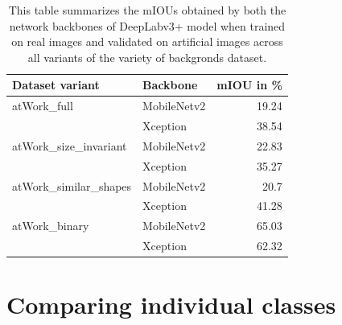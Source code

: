 	\begin{table}
		\centering
		\begin{tabular}{|l|l|r|}
		\hline
		\textbf{Dataset variant}  & \textbf{Backbone} & \multicolumn{1}{l|}{\textbf{mIOU in \%}} \\ \hline
		\multicolumn{ 1}{|l|}{atWork\_full} & MobileNetv2 & 19.24 \\ \cline{ 2- 3}
		\multicolumn{ 1}{|l|}{} & Xception & 38.54 \\ \hline
		\multicolumn{ 1}{|l|}{atWork\_size\_invariant} & MobileNetv2 & 22.83 \\ \cline{ 2- 3}
		\multicolumn{ 1}{|l|}{} & Xception & 35.27 \\ \hline
		\multicolumn{ 1}{|l|}{atWork\_similar\_shapes} & MobileNetv2 & 20.7 \\ \cline{ 2- 3}
		\multicolumn{ 1}{|l|}{} & Xception & 41.28 \\ \hline
		\multicolumn{ 1}{|l|}{atWork\_binary} & MobileNetv2 & 65.03 \\ \cline{ 2- 3}
		\multicolumn{ 1}{|l|}{} & Xception & 62.32 \\ \hline
		\end{tabular}
		\caption{This table summarizes the mIOUs obtained by both the network backbones of DeepLabv3+ model when trained on real images and validated on artificial images across all variants of the variety of backgronds dataset.}
		\label{Table:realaug}
\end{table}


\section{Comparing individual classes}

